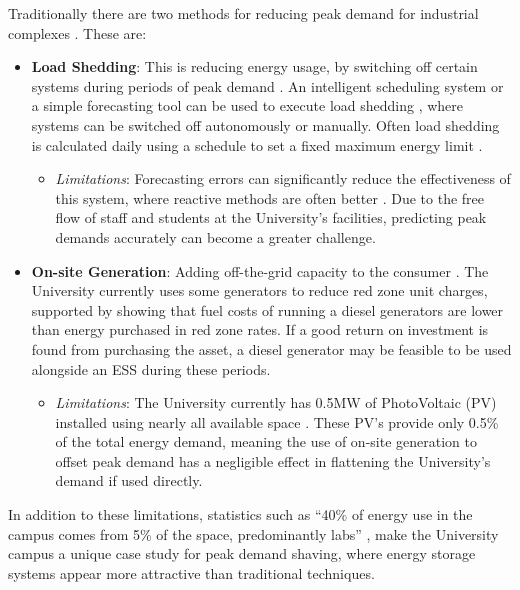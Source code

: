 Traditionally there are two methods for reducing peak demand for
industrial complexes \cite{schneiderRECPS}. These are:

\begin{itemize}
\tightlist
\item
  \textbf{Load Shedding}: This is reducing energy usage, by switching
  off certain systems during periods of peak demand \cite{6199851}. An
  intelligent scheduling system or a simple forecasting tool can be used
  to execute load shedding \cite{Reducing37:online}, where systems can
  be switched off autonomously or manually. Often load shedding is
  calculated daily using a schedule to set a fixed maximum energy limit
  \cite{6938948}.

  \begin{itemize}
  \tightlist
  \item
    \emph{Limitations}: Forecasting errors can significantly reduce the
    effectiveness of this system, where reactive methods are often
    better \cite{6938948}. Due to the free flow of staff and students at
    the University's facilities, predicting peak demands accurately can
    become a greater challenge.
  \end{itemize}
\item
  \textbf{On-site Generation}: Adding off-the-grid capacity to the
  consumer \cite{schneiderRECPS}. The University currently uses some
  generators to reduce red zone unit charges, supported by
  \cite{shen2016} showing that fuel costs of running a diesel generators
  are lower than energy purchased in red zone rates. If a good return on
  investment is found from purchasing the asset, a diesel generator may
  be feasible to be used alongside an ESS during these periods.

  \begin{itemize}
  \tightlist
  \item
    \emph{Limitations}: The University currently has 0.5MW of
    PhotoVoltaic (PV) installed using nearly all available space
    \cite{Jbrentmeet}. These PV's provide only 0.5\% of the total energy
    demand, meaning the use of on-site generation to offset peak demand
    has a negligible effect in flattening the University's demand if
    used directly.
  \end{itemize}
\end{itemize}

In addition to these limitations, statistics such as ``40\% of energy
use in the campus comes from 5\% of the space, predominantly labs''
\cite{brentemail}, make the University campus a unique case study for
peak demand shaving, where energy storage systems appear more attractive
than traditional techniques.

